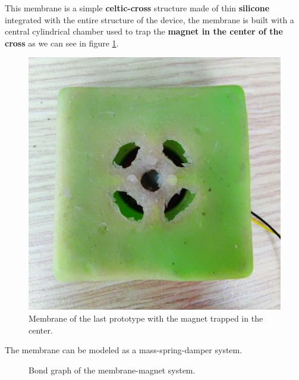 \begin{samepage}
    This membrane is a simple \textbf{celtic-cross} structure made of thin \textbf{silicone} integrated with the entire structure of the device, the membrane is built with a central cylindrical chamber used to trap the \textbf{magnet in the center of the cross} as we can see in figure \ref{fig: Membrane_trap}.
    \nopagebreak
    \begin{figure}[H]
        \centering
        \includegraphics[width = 0.5\linewidth]{Chapters/Chapter2/Modelling_of_Entire_System/Figures/Flexible_mat_small_top.jpg}
        \caption[Membrane mat]{Membrane of the last prototype with the magnet trapped in the center.}
        \label{fig: Membrane_trap}
    \end{figure}
\end{samepage}

\begin{samepage}
    The membrane can be modeled as a mass-spring-damper system.
    \nopagebreak    

    \begin{figure}[H]
        \centering
        \caption{Bond graph of the membrane-magnet system.}
        \label{fig:Membrane_bond_graph}
    \end{figure}
\end{samepage}

